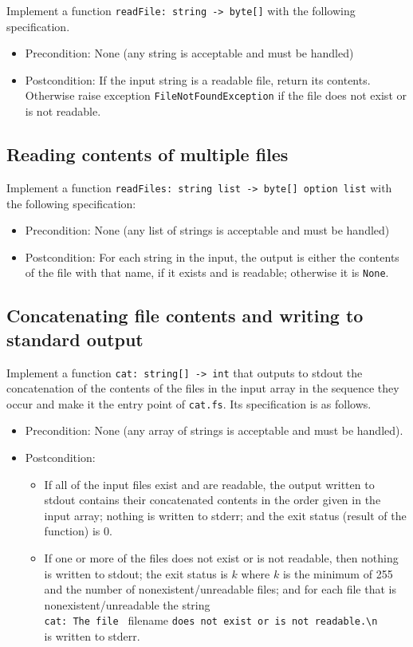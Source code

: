 \documentclass[a4paper,11pt]{article}
\begin{document}
Implement a function \texttt{readFile: string -> byte[]} with the following specification. 
\begin{itemize}
\item Precondition: None (any string is acceptable and must be handled)
\item Postcondition: If the input string is a readable file, return its contents.  Otherwise raise exception \texttt{FileNotFoundException} if the file does not exist or is not readable.
\end{itemize}

\subsection{Reading contents of multiple files}
 
Implement a function \texttt{readFiles: string list -> byte[] option list} with the following specification:
\begin{itemize}
\item Precondition: None (any list of strings is acceptable and must be handled)
\item Postcondition: For each string in the input, the output is either the contents of the file with that name, if it exists and is readable; otherwise it is \texttt{None}.  
\end{itemize}

\subsection{Concatenating file contents and writing to standard output}

Implement a function \texttt{cat: string[] -> int} that outputs to stdout the concatenation of the contents of the files in the input array in the sequence they occur and make it the entry point of \texttt{cat.fs}. Its specification is as follows.
\begin{itemize}
\item Precondition: None (any array of strings is acceptable and must be handled).
\item Postcondition: 
\begin{itemize}
\item If all of the input files exist and are readable, the output written to stdout contains their concatenated contents in the order given in the input array; nothing is written to stderr; and the exit status (result of the function) is $0$.  
\item If one or more of the files does not exist or is not readable, then
nothing is written to stdout; the exit status is $k$ where $k$ is the minimum of 255 and the number of nonexistent/unreadable files; and for each file that is nonexistent/unreadable the string \\ \verb|cat: The file | filename \verb|does not exist or is not readable.\n| \\ is written to stderr.
\end{itemize}
\end{itemize} 
\end{document}
